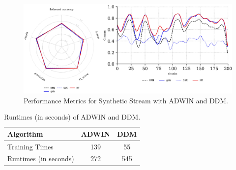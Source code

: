 \begin{figure}[!ht]
	\centering
	\includegraphics[width=1\linewidth]{5_Emerging/images/res4.png}
	\caption{Performance Metrics for Synthetic Stream with ADWIN and DDM.}

	\label{fig:res5}
\end{figure}
	
\begin{table}[!ht]
	\centering
	\caption{Runtimes (in seconds) of ADWIN and DDM.}
	\begin{tabular}{|l|c|c|}
		\hline
	\textbf{Algorithm}     & \textbf{ADWIN} & \textbf{DDM}  \\ \hline
Training Times         & 139          & 55                   \\ \hline
Runtimes (in seconds)         & 272          & 545                   \\ \hline
	
	\end{tabular}
	\label{table:table_4}
	\end{table}